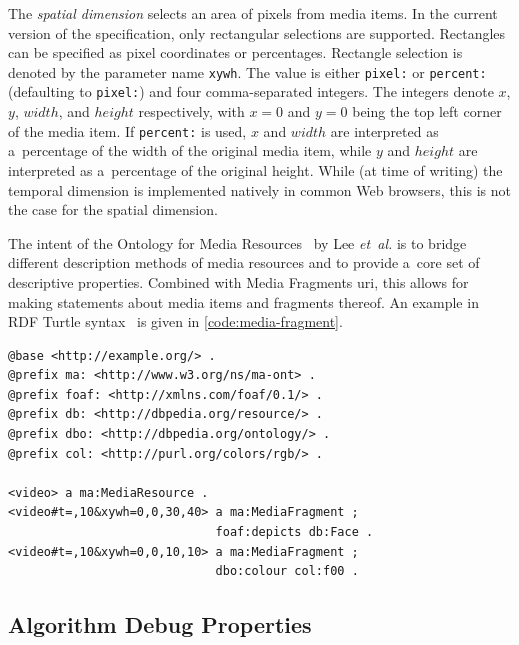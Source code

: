The \emph{spatial dimension} selects an area of pixels from media items.
In the current version of the specification,
only rectangular selections are supported.
Rectangles can be specified as pixel coordinates or percentages.
Rectangle selection is denoted by the parameter name \texttt{xywh}.
The value is either \texttt{pixel:} or \texttt{percent:}
(defaulting to \texttt{pixel:}) and four comma-separated integers.
The integers denote $x$, $y$, $width$, and $height$ respectively,
with $x = 0$ and $y = 0$ being the top left corner of the media item.
If \texttt{percent:} is used,
$x$ and $width$ are interpreted as a~percentage of the width of the original media item,
while $y$ and $height$ are interpreted as a~percentage of the original height.
While (at time of writing) the temporal dimension is implemented natively
in common Web browsers, this is not the case for the spatial dimension.

The intent of the Ontology for Media Resources~\cite{lee2012mediaontology}
by Lee \emph{et~al.} is to bridge different description methods of media resources
and to provide a~core set of descriptive properties.
Combined with Media Fragments {\sc uri}, this allows for making statements
about media items and fragments thereof.
An example in RDF Turtle syntax~\cite{prudhommeaux2013turtle}
is given in \autoref{code:media-fragment}.

\begin{lstlisting}[caption={Description of two 10~sec long media fragments:
  \textit{(i)}~a~tile of dimensions $ 30 \times 40 $ pixels
  starting at pixel coordinates $ (0, 0) $
  that contains a~face; and
  \textit{(ii)}~a~tile of dimensions $ 10 \times 10 $ pixels
  starting at pixel coordinates $ (0, 0) $ of red color},
  label=code:media-fragment, float=b!]
@base <http://example.org/> .
@prefix ma: <http://www.w3.org/ns/ma-ont> .
@prefix foaf: <http://xmlns.com/foaf/0.1/> .
@prefix db: <http://dbpedia.org/resource/> .
@prefix dbo: <http://dbpedia.org/ontology/> .
@prefix col: <http://purl.org/colors/rgb/> .

<video> a ma:MediaResource .
<video#t=,10&xywh=0,0,30,40> a ma:MediaFragment ;
                             foaf:depicts db:Face .
<video#t=,10&xywh=0,0,10,10> a ma:MediaFragment ;
                             dbo:colour col:f00 .
\end{lstlisting}

\subsection{Algorithm Debug Properties}
\label{sec:media-item-deduplication-algorithm}

